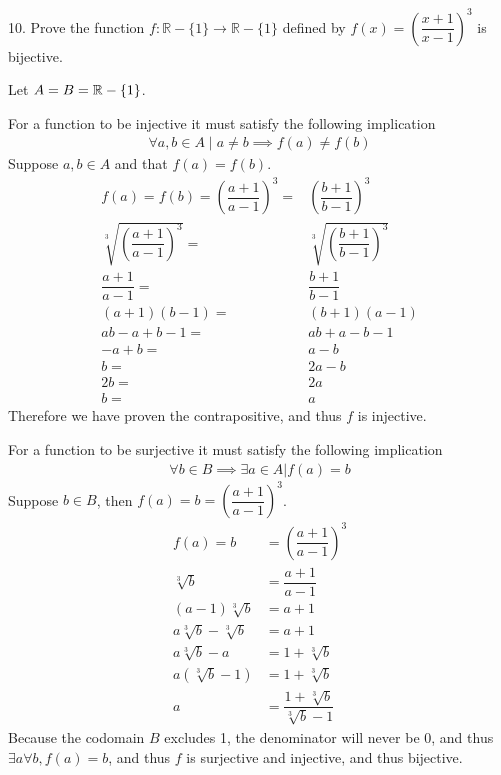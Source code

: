 \documentclass{idrisMemo}
\newcommand{\inj}{
\item For a function to be injective it must satisfy the following implication
\begin{align*}
    \forall a,b \in A\mid a\neq b\implies f(a)\neq f(b)
\end{align*}
}
\newcommand{\surj}{
\item For a function to be surjective it must satisfy the following implication
\begin{align*}
    \forall b \in B \implies \exists a \in A | f(a) = b
\end{align*}
}
\begin{document}
\begin{prooflist}{10. Prove the function $f: \mathbb{R}-\{1\} \rightarrow
    \mathbb{R}-\{1\}$ defined by $f(x)=\left(\dfrac{x+1}{x-1}\right)^3$ is
bijective.}
\item Let $A=B=\mathbb{R}-\{1\}$.
    \inj{}
Suppose $a, b \in A$ and that $f(a)=f(b)$.
\begin{align*}
f(a)=f(b)= \left(\dfrac{a+1}{a-1}\right)^3=& \left(\dfrac{b+1}{b-1}\right)^3\\
\sqrt[3]{\left(\dfrac{a+1}{a-1}\right)^3}=& \sqrt[3]{\left(\dfrac{b+1}{b-1}\right)^3}\\
\dfrac{a+1}{a-1}=& \dfrac{b+1}{b-1}\\
(a+1)(b-1)=& (b+1)(a-1)\\
ab-a+b-1=& ab+a-b-1\\
-a+b=& a-b\\
b=& 2a-b\\
2b=& 2a\\
b=& a
\end{align*}
Therefore we have proven the contrapositive, and thus $f$ is injective.
    \surj{}
Suppose $b\in B$, then $f(a)=b= \left(\dfrac{a+1}{a-1}\right)^3$.
    \begin{align*}
        f(a) = b &= \left(\dfrac{a+1}{a-1}\right)^3\\
        \sqrt[3]{b} &= \dfrac{a+1}{a-1}\\
        (a-1)\sqrt[3]{b} &= {a+1}\\
        a\sqrt[3]{b} - \sqrt[3]{b}&= a+1\\
        a\sqrt[3]{b} - a &= 1+ \sqrt[3]{b}\\
        a(\sqrt[3]{b} - 1) &= 1+ \sqrt[3]{b}\\
        a &= \dfrac{1+ \sqrt[3]{b}}{\sqrt[3]{b} - 1}
    \end{align*}
    Because the codomain $B$ excludes 1, the denominator will never be 0, and
    thus $\exists a\forall b, f(a)=b$, and thus $f$ is surjective and
    injective, and thus bijective.
\end{prooflist}
\end{document}
